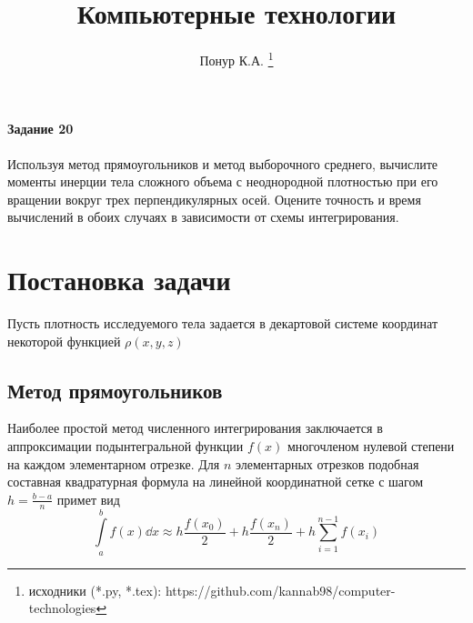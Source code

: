 
\title{Компьютерные технологии}
\author{Понур К.А. 
    \thanks{исходники (*.py, *.tex):
    https://github.com/kannab98/computer-technologies}
}

\maketitle

\paragraph{Задание 20} Используя метод  прямоугольников  и  метод  выборочного  среднего, вычислите моменты инерции тела сложного объема с неоднородной плотностью при его вращении вокруг трех  перпендикулярных  осей. Оцените точность  и  время  вычислений  в  обоих  случаях в зависимости от схемы интегрирования.

\tableofcontents
\section{Постановка задачи}


Пусть плотность исследуемого тела задается в декартовой системе координат 
некоторой функцией $\rho(x,y,z)$

\subsection{Метод прямоугольников}%
\label{sub:metod_priamougol_nikov}

Наиболее простой метод численного интегрирования заключается в аппроксимации
подынтегральной функции $f(x)$ многочленом нулевой степени на каждом
элементарном отрезке. Для $n$ элементарных отрезков подобная составная
квадратурная формула на линейной координатной сетке с шагом
$h=\frac{b-a}{n}$ примет вид
\begin{equation}
    \label{eq:}
    \int\limits_{a}^{b} f(x) \dd x \approx h\frac{f(x_0)}{2} +
    h\frac{f(x_n)}{2} + h\sum\limits_{i=1}^{n-1} f(x_i) 
\end{equation}

